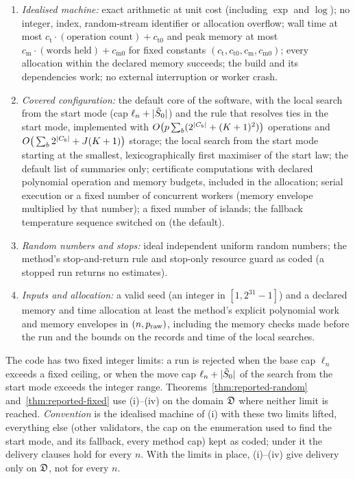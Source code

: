 \begin{enumerate}[label=(\roman*),leftmargin=2em]
  \item \emph{Idealised machine:} exact arithmetic at unit cost (including $\exp$ and $\log$); no integer, index,
    random-stream identifier or allocation overflow; wall time at most $c_{\mathrm t}\cdot(\text{operation count})+c_{\mathrm t0}$ and peak memory at
    most $c_{\mathrm m}\cdot(\text{words held})+c_{\mathrm m0}$ for fixed constants $(c_{\mathrm t},c_{\mathrm t0},c_{\mathrm m},c_{\mathrm m0})$; every allocation within
    the declared memory succeeds; the build and its dependencies work; no external interruption or worker crash.
  \item \emph{Covered configuration:} the default core of the software, with the local search from the start mode (cap
    $\ell_n+\lvert \tilde S_0\rvert$) and the rule that resolves ties in the start mode, implemented with
    $O\big(p\sum_b(2^{\lvert C_b\rvert}+(K+1)^2)\big)$ operations and $O\big(\sum_b2^{\lvert C_b\rvert}+J(K+1)\big)$ storage; the local
    search from the start mode starting at the smallest, lexicographically first maximiser of the start law; the default
    list of summaries only; certificate computations with declared polynomial operation and memory budgets, included in
    the allocation; serial execution or a fixed number of concurrent workers (memory envelope multiplied by that number);
    a fixed number of islands; the fallback temperature sequence switched on (the default).
  \item \emph{Random numbers and stops:} ideal independent uniform random numbers; the method's stop-and-return rule and
    stop-only resource guard as coded (a stopped run returns no estimates).
  \item \emph{Inputs and allocation:} a valid seed (an integer in $[1,2^{31}-1]$) and a declared memory and time allocation
    at least the method's explicit polynomial work and memory envelopes in $(n,p_{\mathrm{raw}})$, including the memory checks made before the run and
    the bounds on the records and time of the local searches.
\end{enumerate}
The code has two fixed integer limits: a run is rejected when the base cap $\ell_n$ exceeds a fixed ceiling, or when the
move cap $\ell_n+\lvert \tilde S_0\rvert$ of the search from the start mode exceeds the integer range. Theorems~\ref{thm:reported-random}
and~\ref{thm:reported-fixed} use (i)--(iv) on the domain $\mathfrak D$ where neither limit is reached. \emph{Convention } is the idealised machine of (i)
with these two limits lifted, everything else (other validators, the cap on the enumeration used to find the start mode, and its fallback, every
method cap) kept as coded; under it the delivery clauses hold for every $n$. With the limits in place, (i)--(iv) give delivery only on $\mathfrak D$, not for every
$n$.

